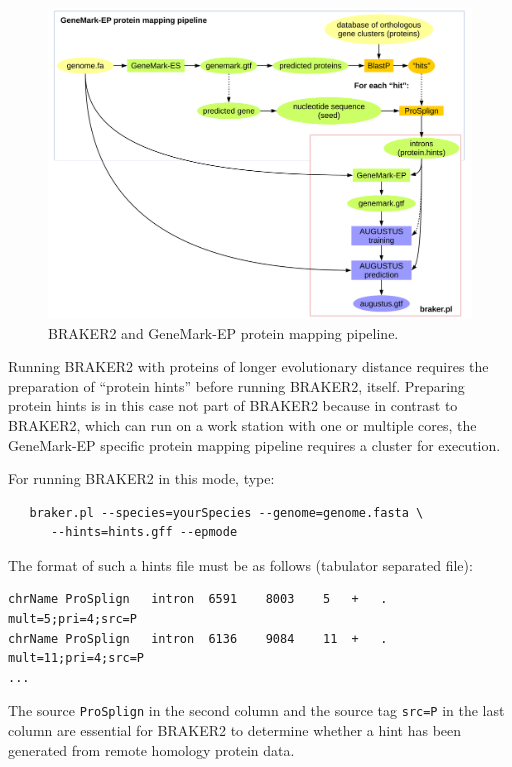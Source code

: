 \documentclass[a4paper,10pt]{report}
\begin{document}
\begin{figure}
 \centering
 \includegraphics[scale=0.4]{./figs/gatech-prot-pipeline.pdf}
 \caption{BRAKER2 and GeneMark-EP protein mapping pipeline.}
 \label{gatech}
\end{figure}

Running BRAKER2 with proteins of longer evolutionary distance requires the preparation of ``protein hints'' before running BRAKER2, itself. Preparing protein hints is in this case not part of BRAKER2 because in contrast to BRAKER2, which can run on a work station with one or multiple cores, the GeneMark-EP specific protein mapping pipeline requires a cluster for execution.

For running BRAKER2 in this mode, type:

\begin{verbatim}
   braker.pl --species=yourSpecies --genome=genome.fasta \
      --hints=hints.gff --epmode
\end{verbatim}

The format of such a hints file must be as follows (tabulator separated file):

\begin{verbatim}
chrName	ProSplign	intron	6591	8003	5	+	.	mult=5;pri=4;src=P
chrName	ProSplign	intron	6136	9084	11	+	.	mult=11;pri=4;src=P
...
\end{verbatim}

The source \texttt{ProSplign} in the second column and the source tag \texttt{src=P} in the last column are essential for BRAKER2 to determine whether a hint has been generated from remote homology protein data. 
\end{document}
